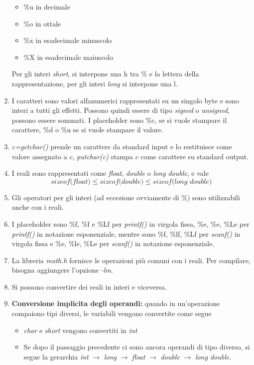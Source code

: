 \documentclass[a4paper,11pt]{article}
\begin{document}
\begin{enumerate}[resume]
\begin{itemize}
		\item \%u in decimale
		\item \%o in ottale
		\item \%x in esadecimale minuscolo
		\item \%X in esadecimale maiuscolo
	\end{itemize}
	Per gli interi \textit{short}, si interpone una h tra \% e la lettera della rappresentazione, per gli interi \textit{long} si interpone una l.
	\item I caratteri sono valori alfanumerici rappresentati su un singolo byte e sono interi a tutti gli effetti. Possono quindi essere di tipo \textit{signed} o \textit{unsigned}, possono essere sommati. I placeholder sono \%c, se si vuole stampare il carattere, \%d o \%u se si vuole stampare il valore.
	\item \textit{c=getchar()} prende un carattere da standard input e lo restituisce come valore assegnato a $c$, \textit{putchar(c)} stampa $c$ come carattere su standard output.
	\item I reali sono rappresentati come \textit{float}, \textit{double} o \textit{long double}, e vale
	\[\textit{sizeof(float)}\leq\textit{sizeof(double)}\leq\textit{sizeof(long double)}\]
	\item Gli operatori per gli interi (ad eccezione ovviamente di \%) sono utilizzabili anche con i reali.
	\item I placeholder sono \%f, \%f e \%Lf per \textit{printf()} in virgola fissa, \%e, \%e, \%Le per \textit{printf()} in notazione esponenziale, mentre sono \%f, \%lf, \%Lf per \textit{scanf()} in virgola fissa e \%e, \%le, \%Le per \textit{scanf()} in notazione esponenziale.
	\item La libreria \textit{math.h} fornisce le operazioni più comuni con i reali. Per compilare, bisogna aggiungere l'opzione \textit{-lm}.
	\item Si possono convertire dei reali in interi e viceversa.
	\item \textbf{Conversione implicita degli operandi:} quando in un'operazione compaiono tipi diversi, le variabili vengono convertite come segue
	\begin{itemize}
		\item \textit{char} e \textit{short} vengono convertiti in \textit{int}
		\item Se dopo il passaggio precedente ci sono ancora operandi di tipo diverso, si segue la gerarchia \textit{int} $\to$ \textit{long} $\to$ \textit{float} $\to$ \textit{double} $\to$ \textit{long double}.

\end{itemize}
\end{enumerate}
\end{document}
